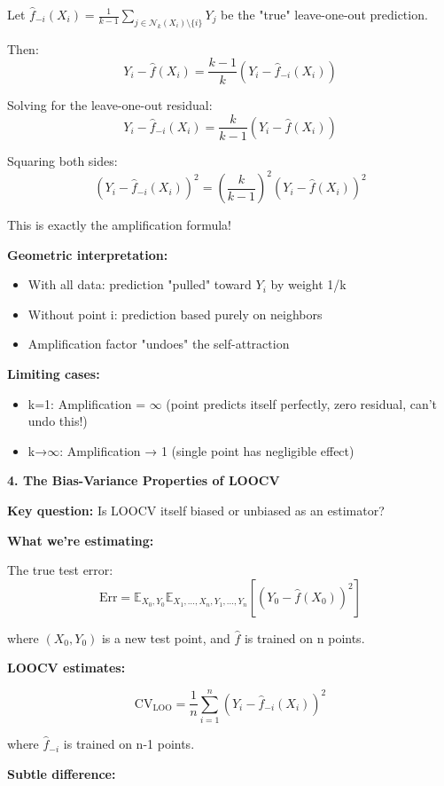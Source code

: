 \documentclass[12pt]{article}
\begin{document}
\begin{explanation}
Let $\hat{f}_{-i}(X_i) = \frac{1}{k-1}\sum_{j \in \mathcal{N}_k(X_i) \setminus \{i\}} Y_j$ be the "true" leave-one-out prediction.

Then:
\[
Y_i - \hat{f}(X_i) = \frac{k-1}{k}(Y_i - \hat{f}_{-i}(X_i))
\]

Solving for the leave-one-out residual:
\[
Y_i - \hat{f}_{-i}(X_i) = \frac{k}{k-1}(Y_i - \hat{f}(X_i))
\]

Squaring both sides:
\[
(Y_i - \hat{f}_{-i}(X_i))^2 = \left(\frac{k}{k-1}\right)^2(Y_i - \hat{f}(X_i))^2
\]

This is exactly the amplification formula!

\textbf{Geometric interpretation:}

\begin{itemize}
    \item With all data: prediction "pulled" toward $Y_i$ by weight 1/k
    \item Without point i: prediction based purely on neighbors
    \item Amplification factor "undoes" the self-attraction
\end{itemize}

\textbf{Limiting cases:}

\begin{itemize}
    \item k=1: Amplification = $\infty$ (point predicts itself perfectly, zero residual, can't undo this!)
    \item k→$\infty$: Amplification → 1 (single point has negligible effect)
\end{itemize}

\textbf{4. The Bias-Variance Properties of LOOCV}

\textbf{Key question:} Is LOOCV itself biased or unbiased as an estimator?

\textbf{What we're estimating:}

The true test error:
\[
\text{Err} = \mathbb{E}_{X_0, Y_0}\mathbb{E}_{X_1, \ldots, X_n, Y_1, \ldots, Y_n}\left[(Y_0 - \hat{f}(X_0))^2\right]
\]

where $(X_0, Y_0)$ is a new test point, and $\hat{f}$ is trained on n points.

\textbf{LOOCV estimates:}

\[
\text{CV}_{\text{LOO}} = \frac{1}{n}\sum_{i=1}^n (Y_i - \hat{f}_{-i}(X_i))^2
\]

where $\hat{f}_{-i}$ is trained on n-1 points.

\textbf{Subtle difference:}


\end{explanation}
\end{document}
